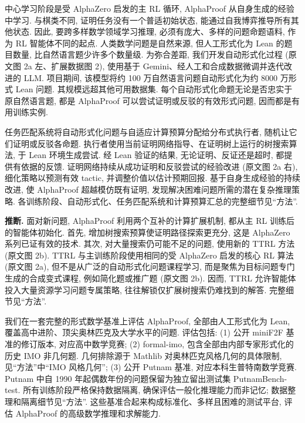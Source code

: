 中心学习阶段是受 AlphaZero 启发的主 RL 循环, AlphaProof 从自身生成的经验中学习. 与棋类不同, 证明任务没有一个普适初始状态, 能通过自我博弈推导所有其他状态. 因此, 要跨多样数学领域学习推理, 必须有庞大、多样的问题命题语料, 作为 RL 智能体不同的起点. 人类数学问题是自然来源, 但人工形式化为 Lean 的题目数量, 比自然语言题少许多个数量级. 为弥合差距, 我们开发自动形式化过程 (原文图 2a 左、扩展数据图 2), 使用基于 Gemini、经人工和合成数据微调并迭代改进的 LLM. 项目期间, 该模型将约 100 万自然语言问题自动形式化为约 8000 万形式 Lean 问题. 其规模远超其他可用数据集. 每个自动形式化命题无论是否忠实于原自然语言题, 都是 AlphaProof 可以尝试证明或反驳的有效形式问题, 因而都是有用训练实例.



任务匹配系统将自动形式化问题与自适应计算预算分配给分布式执行者, 随机让它们证明或反驳各命题. 执行者使用当前证明网络指导、在证明树上运行的树搜索算法, 于 Lean 环境生成尝试. 经 Lean 验证的结果, 无论证明、反证还是超时, 都提供有依据的反馈. 证明网络持续从成功证明和反驳尝试的经验改进 (原文图 2a 右), 细化策略以预测有效 tactic, 并调整价值以估计预期回报. 基于自身生成经验的持续改进, 使 AlphaProof 超越模仿既有证明, 发现解决困难问题所需的潜在复杂推理策略. 各训练阶段、自动形式化、任务匹配系统和计算预算汇总的完整细节见“方法”.

\noindent\textbf{推断.} 面对新问题, AlphaProof 利用两个互补的计算扩展机制, 都从主 RL 训练后的智能体初始化. 首先, 增加树搜索预算使证明路径探索更充分, 这是 AlphaZero 系列\cite{alphaproof-ref2}已证有效的技术. 其次, 对大量搜索仍可能不足的问题, 使用新的 TTRL 方法 (原文图 2b). TTRL 与主训练阶段使用相同的受 AlphaZero 启发的核心 RL 算法 (原文图 2a), 但不是从广泛的自动形式化问题课程学习, 而是聚焦为目标问题专门生成的合成变式课程, 例如简化题或推广题 (原文图 2b). 因而, TTRL 允许智能体投入大量资源学习问题专属策略, 往往解锁仅扩展树搜索仍难找到的解答. 完整细节见“方法”.

\label{alphaproof-benchmarks}
我们在一套完整的形式数学基准上评估 AlphaProof, 全部由人工形式化为 Lean, 覆盖高中进阶、顶尖奥林匹克及大学水平的问题. 评估包括: (1) 公开 miniF2F 基准\cite{alphaproof-ref20}的修订版本, 对应高中数学竞赛; (2) formal-imo, 包含全部由内部专家形式化的历史 IMO 非几何题. 几何排除源于 Mathlib 对奥林匹克风格几何的具体限制, 见“方法”中“IMO 风格几何”; (3) 公开 Putnam 基准\cite{alphaproof-ref21}, 对应本科生普特南数学竞赛. Putnam 中自 1990 年起偶数年份的问题保留为独立留出测试集 PutnamBench-test. 所有训练阶段严格保持数据隔离, 确保评估一般化推理能力而非记忆; 数据整理和隔离细节见“方法”. 这些基准合起来构成标准化、多样且困难的测试平台, 评估 AlphaProof 的高级数学推理和求解能力.

